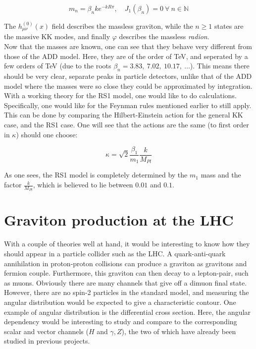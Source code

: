 \documentclass[11pt,a4paper]{article}
\begin{document}
\begin{equation}
	m_n = \beta_n ke^{-kR\pi},\quad J_1(\beta_n) = 0 \:\forall\: n\in\mathbb{N}
\end{equation}

The $h_{\mu\nu}^{(0)}(x)$ field describes the massless graviton, while the $n\geq 1$ states are the massive KK modes, and finally $\varphi$ describes the massless \emph{radion}.\\

Now that the masses are known, one can see that they behave very different from those of the ADD model. Here, they are of the order of TeV, and seperated by a few orders of TeV (due to the roots $\beta_n = 3.83,\:7.02,\:10.17,\:\ldots$). This means there should be very clear, separate peaks in particle detectors, unlike that of the ADD model where the masses were so close they could be approximated by integration.\\
With a working theory for the RS1 model, one would like to do calculations. Specifically, one would like for the Feynman rules mentioned earlier to still apply. This can be done by comparing the Hilbert-Einstein action for the general KK case, and the RS1 case. One will see that the actions are the same (to first order in $\kappa$) should one choose:

\begin{equation}
	\kappa = \sqrt{2}\frac{\beta_1}{m_1}\frac{k}{M_{Pl}}
\end{equation}

As one sees, the RS1 model is completely determined by the $m_1$ mass and the factor $\frac{k}{M_{Pl}}$, which is believed to lie between $0.01$ and $0.1$\cite{DHR}.

\section{Graviton production at the LHC}
With a couple of theories well at hand, it would be interesting to know how they should appear in a particle collider such as the LHC. A quark-anti-quark annihilation in proton-proton collisions can produce a graviton as gravitons and fermion couple. Furthermore, this graviton can then decay to a lepton-pair, such as muons. Obviously there are many channels that give off a dimuon final state. However, there are no spin-2 particles in the standard model, and measuring the angular distribution would be expected to give a characteristic contour. One example of angular distribution is the differential cross section. Here, the angular dependency would be interesting to study and compare to the corresponding scalar and vector channels ($H$ and $\gamma,Z$), the two of which have already been studied in previous projects.
\end{document}
